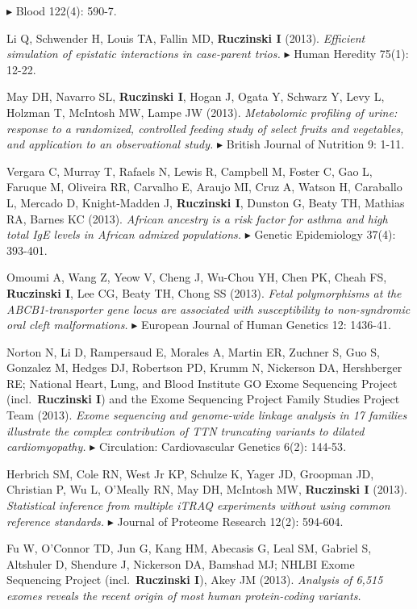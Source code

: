 \documentclass[10pt]{article}
\newcommand{\mine}{
  \addtocounter{enumi}{1}
\item[\fcolorbox{white}{grey}{\color{white} \tiny \arabic{enumi}}]
}
\newcommand{\dg}[1]{{\color{black} $\blacktriangleright$ {#1}}}
\begin{document}
\dg{Blood 122(4): 590-7.}
\mine
Li Q, Schwender H, Louis TA, Fallin MD, {\bf Ruczinski I} (2013).
{\it Efficient simulation of epistatic interactions in case-parent trios.}
\dg{Human Heredity 75(1): 12-22}.
\item 
May DH, Navarro SL, {\bf Ruczinski I}, Hogan J, Ogata Y, Schwarz Y, Levy L, Holzman T, McIntosh MW, Lampe JW (2013).
{\it Metabolomic profiling of urine: response to a randomized, controlled feeding study of select fruits and vegetables, and application to an observational study.}
\dg{British Journal of Nutrition 9: 1-11}.
\item 
Vergara C, Murray T, Rafaels N, Lewis R, Campbell M, Foster C, Gao L, Faruque M, Oliveira RR, Carvalho E, Araujo MI, Cruz A, Watson H, Caraballo L, Mercado D, Knight-Madden J, {\bf Ruczinski I}, Dunston G, Beaty TH, Mathias RA, Barnes KC (2013).
{\it African ancestry is a risk factor for asthma and high total IgE levels in African admixed populations.}
\dg{Genetic Epidemiology 37(4): 393-401}. 
\item 
Omoumi A, Wang Z, Yeow V, Cheng J, Wu-Chou YH, Chen PK, Cheah FS, {\bf Ruczinski I}, Lee CG, Beaty TH, Chong SS (2013).
{\it Fetal polymorphisms at the ABCB1-transporter gene locus are associated with susceptibility to non-syndromic oral cleft malformations.}
\dg{European Journal of Human Genetics 12: 1436-41}. 
\item
Norton N, Li D, Rampersaud E, Morales A, Martin ER, Zuchner S, Guo S, Gonzalez M, Hedges DJ, Robertson PD, Krumm N, Nickerson DA, Hershberger RE; National Heart, Lung, and Blood Institute GO Exome Sequencing Project (incl.~{\bf Ruczinski I}) and the Exome Sequencing Project Family Studies Project Team (2013). 
{\it Exome sequencing and genome-wide linkage analysis in 17 families illustrate the complex contribution of TTN truncating variants to dilated cardiomyopathy.}
\dg{Circulation: Cardiovascular Genetics 6(2): 144-53}. 
\mine
Herbrich SM, Cole RN, West Jr KP, Schulze K, Yager JD, Groopman JD, Christian P, Wu L, O'Meally RN, May DH, McIntosh MW, {\bf Ruczinski I} (2013).
{\it Statistical inference from multiple iTRAQ experiments without using common reference standards.}
\dg{Journal of Proteome Research 12(2): 594-604.}
\item 
Fu W, O'Connor TD, Jun G, Kang HM, Abecasis G, Leal SM, Gabriel S, Altshuler D, Shendure J, Nickerson DA, Bamshad MJ; NHLBI Exome Sequencing Project (incl.~{\bf Ruczinski I}), Akey JM (2013).
{\it Analysis of 6,515 exomes reveals the recent origin of most human protein-coding variants.}
\end{document}

